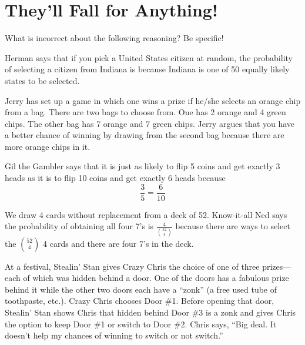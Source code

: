 \newpage
\section{They'll Fall for Anything!}\label{A:fallForAnything}

What is incorrect about the following reasoning? Be specific!

\begin{prob}
Herman says that if you pick a United States citizen at random, the
probability of selecting a citizen from Indiana is because Indiana is
one of 50 equally likely states to be selected.
\end{prob}


\begin{prob}
Jerry has set up a game in which one wins a prize if he/she selects an
orange chip from a bag.  There are two bags to choose from.  One has 2
orange and 4 green chips.  The other bag has 7 orange and 7 green
chips.  Jerry argues that you have a better chance of winning by
drawing from the second bag because there are more orange chips in it.
\end{prob}

\begin{prob}
Gil the Gambler says that it is just as likely to flip 5 coins and get
exactly 3 heads as it is to flip 10 coins and get exactly 6 heads
because
\[
\frac{3}{5} = \frac{6}{10}
\]
\end{prob}

\begin{prob}
We draw 4 cards without replacement from a deck of 52.  Know-it-all
Ned says the probability of obtaining all four 7's is
$\frac{4}{\binom{52}{4}}$ because there are ways to select the
$\binom{52}{4}$ 4 cards and there are four 7's in the deck.
\end{prob} 

\begin{prob}
At a festival, Stealin' Stan gives Crazy Chris the choice of one of
three prizes---each of which was hidden behind a door.  One of the
doors has a fabulous prize behind it while the other two doors each
have a ``zonk'' (a free used tube of toothpaste, etc.).  Crazy Chris
chooses Door \#1.  Before opening that door, Stealin' Stan shows Chris
that hidden behind Door \#3 is a zonk and gives Chris the option to
keep Door \#1 or switch to Door \#2.  Chris says, ``Big deal.  It doesn't
help my chances of winning to switch or not switch.''
\end{prob}
